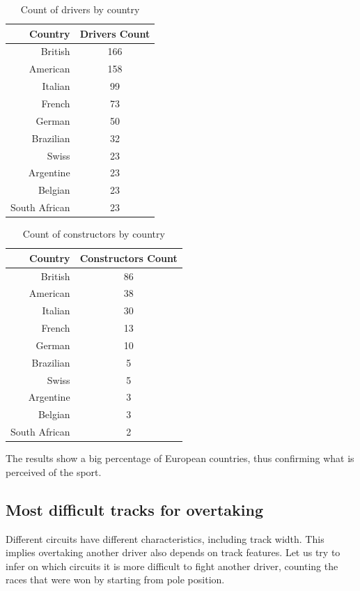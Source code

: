 \documentclass{Configuration_Files/PoliMi3i_thesis}
\begin{document}
\newpage
\begin{table}[!h]
    \centering
    \begin{tabular}{|r|c|}
        \hline
        \textbf{Country} & \textbf{Drivers Count} \\
        \hline
        British & 166 \\
        American & 158 \\
        Italian & 99 \\
        French & 73 \\
        German & 50 \\
        Brazilian & 32 \\
        Swiss & 23 \\
        Argentine & 23 \\
        Belgian & 23 \\
        South African & 23 \\
        \hline
    \end{tabular}
    \caption{Count of drivers by country}
\end{table}

\begin{table}[!h]
    \centering
    \begin{tabular}{|r|c|}
        \hline
        \textbf{Country} & \textbf{Constructors Count} \\
        \hline
        British & 86 \\
        American & 38 \\
        Italian & 30 \\
        French & 13 \\
        German & 10 \\
        Brazilian & 5 \\
        Swiss & 5 \\
        Argentine & 3 \\
        Belgian & 3 \\
        South African & 2 \\
        \hline
    \end{tabular}
    \caption{Count of constructors by country}
\end{table}

The results show a big percentage of European countries, thus confirming what is perceived of the sport.


\subsection{Most difficult tracks for overtaking}
Different circuits have different characteristics, including track width. This implies overtaking another driver also depends on track features. Let us try to infer on which circuits it is more difficult to fight another driver, counting the races that were won by starting from pole position.
\end{document}
